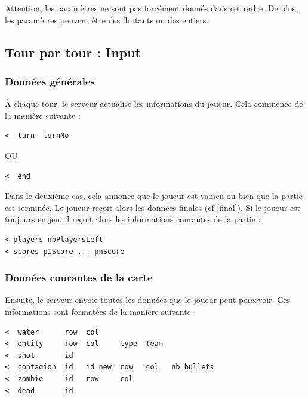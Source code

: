 Attention, les paramètres ne sont pas forcément donnés dans cet ordre.
De plus, les paramètres peuvent être des flottants ou des entiers.




\subsection{Tour par tour : Input} %
\label{input}

\subsubsection{Données générales} %
À chaque tour, le serveur actualise les informations du joueur.
Cela commence de la manière suivante :

\begin{lstlisting}
<  turn  turnNo
\end{lstlisting}
\begin{center}
OU
\end{center}
\begin{lstlisting}
<  end
\end{lstlisting}

Dans le deuxième cas, cela annonce que le joueur est vaincu ou bien que la partie est terminée.
Le joueur reçoit alors les données finales (cf \ref{final}).
Si le joueur est toujours en jeu, il reçoit alors les informations courantes de la partie :

\begin{lstlisting}
< players nbPlayersLeft
< scores p1Score ... pnScore
\end{lstlisting}

\subsubsection{Données courantes de la carte} %

Ensuite, le serveur envoie toutes les données que le joueur peut percevoir.
Ces informations sont formatées de la manière suivante :

\lstset{numbers=left}
\begin{lstlisting}
<  water      row  col
<  entity     row  col     type  team
<  shot       id
<  contagion  id   id_new  row   col   nb_bullets
<  zombie     id   row     col
<  dead       id
\end{lstlisting}
\lstset{numbers=none}


